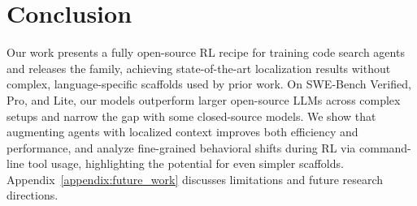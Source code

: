 \section{Conclusion}
Our work presents a fully open-source RL recipe for training code search agents and releases the \methodname family, achieving state-of-the-art localization results without complex, language-specific scaffolds used by prior work. On SWE-Bench Verified, Pro, and Lite, our models outperform larger open-source LLMs across complex setups and narrow the gap with some closed-source models. We show that augmenting agents with localized context improves both efficiency and performance, and analyze fine-grained behavioral shifts during RL via command-line tool usage, highlighting the potential for even simpler scaffolds. Appendix~\ref{appendix:future_work} discusses limitations and future research directions.